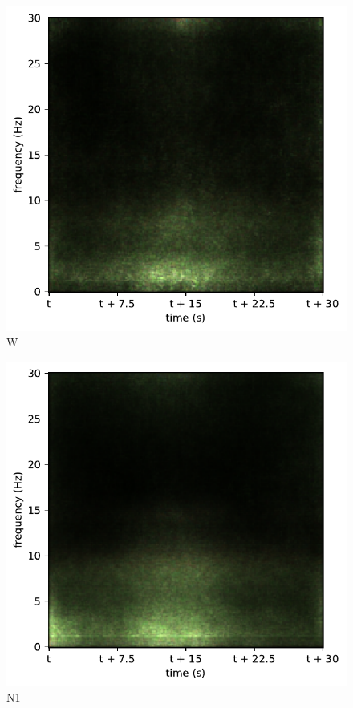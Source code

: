 \begin{subfigure}{.16\textwidth}
  \centering
  \includegraphics[width=1\linewidth]{./../Article/pics/class_master_0}
  \caption{W}
  \label{fig_1_21}
\end{subfigure}%
\begin{subfigure}{.16\textwidth}
  \centering
  \includegraphics[width=1\linewidth]{./../Article/pics/class_master_1}
  \caption{N1}
  \label{fig_1_22}
\end{subfigure}%
